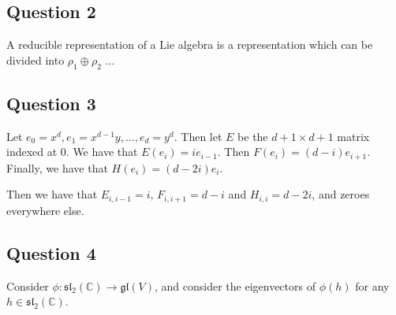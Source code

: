 \documentclass[]{article}
\begin{document}
\subsection*{Question 2}
A reducible representation of a Lie algebra is a representation which can be divided into $\rho_1 \oplus \rho_2$ ... 
\subsection*{Question 3}
Let $e_0 = x^d, e_1 = x^{d - 1} y , ... , e_d = y^d$. Then let $E$ be the $d + 1 \times d + 1$ matrix indexed at 0. We have that $E(e_i) = i e_{i - 1}$. Then $F(e_i) = (d - i) e_{i + 1}$. Finally, we have that $H(e_i) = (d - 2i) e_i$. 

Then we have that $E_{i, i - 1} = i$, $F_{i, i + 1} = d - i$ and $H_{i, i} = d - 2i$, and zeroes everywhere else. 

\subsection*{Question 4}
Consider $\phi: \mathfrak{sl}_2(\mathbb{C}) \rightarrow \mathfrak{gl}(V)$, and consider the eigenvectors of $\phi(h)$ for any $h \in \mathfrak{sl}_2(\mathbb{C})$. 
\end{document}
